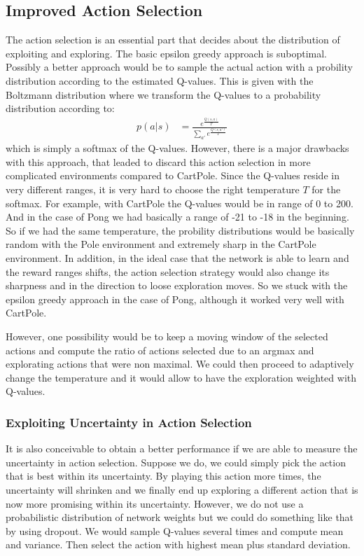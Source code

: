 \documentclass[10pt,a4paper]{article}
\begin{document}
\subsection{Improved Action Selection}
The action selection is an essential part that decides about the distribution of exploiting and exploring. The basic epsilon greedy approach is suboptimal. Possibly a better approach would be to sample the actual action with a probility distribution according to the estimated Q-values. This is given with the Boltzmann distribution where we transform the Q-values to a probability distribution according to:
\begin{align*}
  p(a | s) &= \frac{e^{\frac{Q(s, a)}{T}}}{\sum_{a'} e^{\frac{Q(s, a')}{T}}}
\end{align*}
which is simply a softmax of the Q-values. However, there is a major drawbacks with this approach, that leaded to discard this action selection in more complicated environments compared to CartPole. Since the Q-values reside in very different ranges, it is very hard to choose the right temperature $T$ for the softmax. For example, with CartPole the Q-values would be in range of 0 to 200. And in the case of Pong we had basically a range of -21 to -18 in the beginning. So if we had the same temperature, the probility distributions would be basically random with the Pole environment and extremely sharp in the CartPole environment. In addition, in the ideal case that the network is able to learn and the reward ranges shifts, the action selection strategy would also change its sharpness and in the direction to loose exploration moves. So we stuck with the epsilon greedy approach in the case of Pong, although it worked very well with CartPole.

However, one possibility would be to keep a moving window of the selected actions and compute the ratio of actions selected due to an argmax and explorating actions that were non maximal. We could then proceed to adaptively change the temperature and it would allow to have the exploration weighted with Q-values.

\subsubsection{Exploiting Uncertainty in Action Selection}
It is also conceivable to obtain a better performance if we are able to measure the uncertainty in action selection. Suppose we do, we could simply pick the action that is best within its uncertainty. By playing this action more times, the uncertainty will shrinken and we finally end up exploring a different action that is now more promising within its uncertainty. However, we do not use a probabilistic distribution of network weights but we could do something like that by using dropout. We would sample Q-values several times and compute mean and variance. Then select the action with highest mean plus standard deviation.
\end{document}
